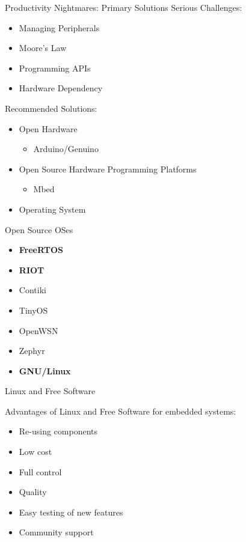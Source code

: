 \begin{frame}{Productivity Nightmares: Primary Solutions}
    Serious Challenges:
    \begin{itemize}
        \item Managing Peripherals 
        \item Moore's Law
        \item Programming APIs
        \item Hardware Dependency
    \end{itemize}
    
    Recommended Solutions:
    \begin{itemize}
        \item Open Hardware
            \begin{itemize}
                \item Arduino/Genuino
            \end{itemize}
        \item Open Source Hardware Programming Platforms
        \begin{itemize}
             \item Mbed
        \end{itemize}
        \item Operating System
    \end{itemize}
\end{frame}



\begin{frame}{Open Source OSes}
    
    \begin{itemize}
  
  \item \textbf{FreeRTOS}
  \item \textbf{RIOT}
  \item Contiki
  \item TinyOS
  \item OpenWSN
  \item Zephyr
  \item \textbf{GNU/Linux}
  
    \end{itemize}
    
\end{frame}


\begin{frame}{Linux and Free Software}

Advantages of Linux and Free Software for embedded systems:

\begin{itemize}
    \item Re-using components
    \item Low cost
    \item Full control
    \item Quality
    \item Easy testing of new features
    \item Community support
\end{itemize}
    
\end{frame}



